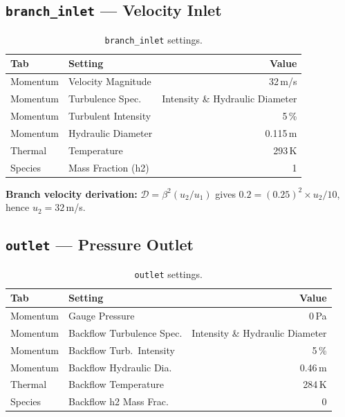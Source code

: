 \documentclass[12pt,a4paper]{report}
\begin{document}
\subsection{\texttt{branch\_inlet} --- Velocity Inlet}

\begin{table}[H]
\centering
\caption{\texttt{branch\_inlet} settings.}
\begin{tabular}{@{}llr@{}}
\toprule
\textbf{Tab} & \textbf{Setting} & \textbf{Value} \\
\midrule
Momentum & Velocity Magnitude     & 32\,m/s \\
Momentum & Turbulence Spec.       & Intensity \& Hydraulic Diameter \\
Momentum & Turbulent Intensity    & 5\,\% \\
Momentum & Hydraulic Diameter     & 0.115\,m \\
Thermal  & Temperature            & 293\,K \\
Species  & Mass Fraction (h2)     & 1 \\
\bottomrule
\end{tabular}
\end{table}

\noindent\textbf{Branch velocity derivation:}
$\mathcal{D} = \beta^2 (u_2/u_1)$ gives
$0.2 = (0.25)^2 \times u_2/10$, hence $u_2 = 32$\,m/s.

\subsection{\texttt{outlet} --- Pressure Outlet}

\begin{table}[H]
\centering
\caption{\texttt{outlet} settings.}
\begin{tabular}{@{}llr@{}}
\toprule
\textbf{Tab} & \textbf{Setting} & \textbf{Value} \\
\midrule
Momentum & Gauge Pressure            & 0\,Pa \\
Momentum & Backflow Turbulence Spec. & Intensity \& Hydraulic Diameter \\
Momentum & Backflow Turb.\ Intensity & 5\,\% \\
Momentum & Backflow Hydraulic Dia.   & 0.46\,m \\
Thermal  & Backflow Temperature      & 284\,K \\
Species  & Backflow h2 Mass Frac.    & 0 \\
\bottomrule
\end{tabular}
\end{table}
\end{document}
